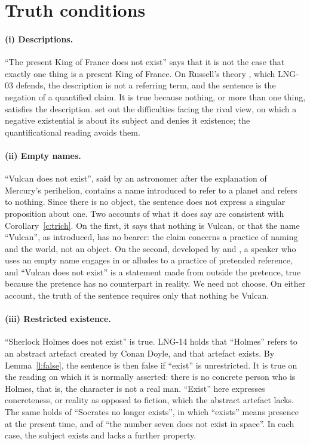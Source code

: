 \documentclass{situationist-preprint}
\begin{document}
\section{Truth conditions}

\paragraph{(i) Descriptions.} \enquote{The present King of France does not exist} says that it is not the case that exactly one thing is a present King of France. On Russell's theory \citep{Russell1905}, which LNG-03 defends, the description is not a referring term, and the sentence is the negation of a quantified claim. It is true because nothing, or more than one thing, satisfies the description. \citet{Cartwright1960} set out the difficulties facing the rival view, on which a negative existential is about its subject and denies it existence; the quantificational reading avoids them.

\paragraph{(ii) Empty names.} \enquote{Vulcan does not exist}, said by an astronomer after the explanation of Mercury's perihelion, contains a name introduced to refer to a planet and refers to nothing. Since there is no object, the sentence does not express a singular proposition about one. Two accounts of what it does say are consistent with Corollary~\ref{c:trich}. On the first, it says that nothing is Vulcan, or that the name \enquote{Vulcan}, as introduced, has no bearer: the claim concerns a practice of naming and the world, not an object. On the second, developed by \citet[ch.~10]{Evans1982} and \citet{Kripke2013}, a speaker who uses an empty name engages in or alludes to a practice of pretended reference, and \enquote{Vulcan does not exist} is a statement made from outside the pretence, true because the pretence has no counterpart in reality. We need not choose. On either account, the truth of the sentence requires only that nothing be Vulcan.

\paragraph{(iii) Restricted existence.} \enquote{Sherlock Holmes does not exist} is true. LNG-14 holds that \enquote{Holmes} refers to an abstract artefact created by Conan Doyle, and that artefact exists. By Lemma~\ref{l:false}, the sentence is then false if \enquote{exist} is unrestricted. It is true on the reading on which it is normally asserted: there is no concrete person who is Holmes, that is, the character is not a real man. \enquote{Exist} here expresses concreteness, or reality as opposed to fiction, which the abstract artefact lacks. The same holds of \enquote{Socrates no longer exists}, in which \enquote{exists} means presence at the present time, and of \enquote{the number seven does not exist in space}. In each case, the subject exists and lacks a further property.
\end{document}
